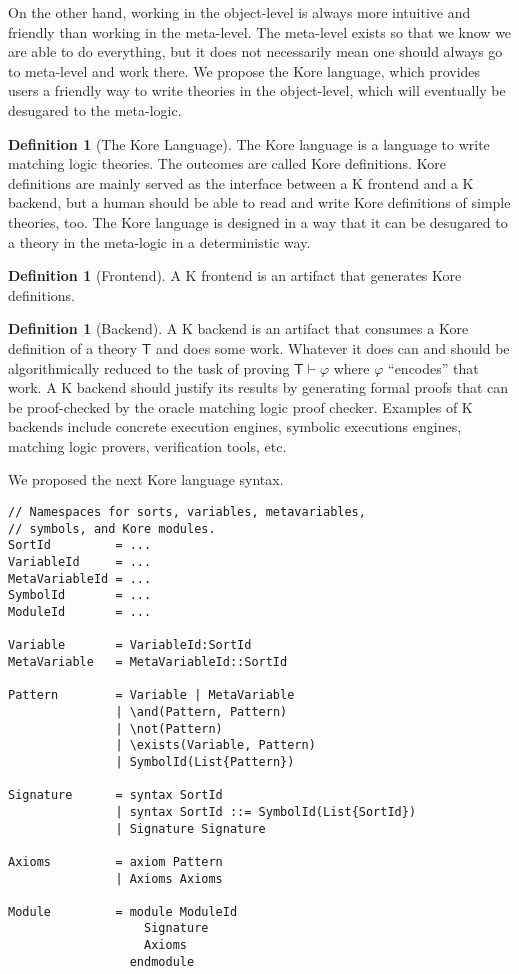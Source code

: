 \documentclass[UTF8]{article}
\newcounter{thmcounter}
\theoremstyle{plain}
\theoremstyle{definition}
\newtheorem{definition}[thmcounter]{Definition}
\theoremstyle{remark}
\begin{document}
On the other hand, working in the object-level is always more intuitive and friendly than working in the meta-level. The meta-level exists so that we know we are able to do everything, but it does not necessarily mean one should always go to meta-level and work there. We propose the Kore language, which provides users a friendly way to write theories in the object-level, which will eventually be desugared to the meta-logic. 

\begin{definition}[The Kore Language]
The Kore language is a language to write matching logic theories. The outcomes are called Kore definitions. Kore definitions are mainly served as the interface between a K frontend and a K backend, but a human should be able to read and write Kore definitions of simple theories, too. The Kore language is designed in a way that it can be desugared to a theory in the meta-logic in a deterministic way.
\end{definition}

\begin{definition}[Frontend]
A K frontend is an artifact that generates Kore definitions.
\end{definition}

\begin{definition}[Backend]
A K backend is an artifact that consumes a Kore definition of a theory $\mathsf{T}$ and does some work. Whatever it does can and should be algorithmically reduced to the task of proving $\mathsf{T} \vdash \varphi$ where $\varphi$ ``encodes'' that work. A K backend should justify its results by generating formal proofs that can be proof-checked by the oracle matching logic proof checker. Examples of K backends include concrete execution engines, symbolic executions engines, matching logic provers, verification tools, etc.
\end{definition}

We proposed the next Kore language syntax. 

\begin{Verbatim}
// Namespaces for sorts, variables, metavariables,
// symbols, and Kore modules.
SortId         = ...
VariableId     = ...
MetaVariableId = ...
SymbolId       = ...
ModuleId       = ...

Variable       = VariableId:SortId
MetaVariable   = MetaVariableId::SortId

Pattern        = Variable | MetaVariable
               | \and(Pattern, Pattern)
               | \not(Pattern)
               | \exists(Variable, Pattern)
               | SymbolId(List{Pattern})

Signature      = syntax SortId
               | syntax SortId ::= SymbolId(List{SortId})
               | Signature Signature

Axioms         = axiom Pattern
               | Axioms Axioms

Module         = module ModuleId
                   Signature
                   Axioms
                 endmodule
\end{Verbatim}
\end{document}
